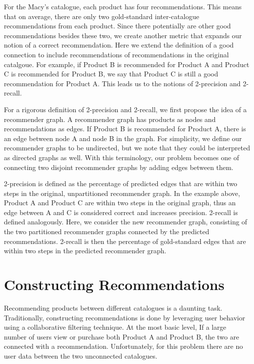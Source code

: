 \documentclass[11pt]{article}
\begin{document}
For the Macy's catalogue, each product has four recommendations. This means that
on average, there are only two gold-standard inter-catalogue recommendations
from each product. Since there potentially are other good
recommendations besides these two, we create another metric that expands our
notion of a correct recommendation. Here we extend the definition of a good
connection to include recommendations of recommendations in the original
catalgoue. For example, if Product B is recommended for Product A and 
Product C is recommended for Product B, we say that Product C is still a good 
recommendation for Product A. This leads us to the notions of 2-precision and 
2-recall.

For a rigorous definition of 2-precision and 2-recall, we first propose the idea
of a recommender graph. A recommender graph has products as nodes and
recommendations as edges. If Product B is recommended for Product A, there is an
edge between node A and node B in the graph. For simplicity, we define our
recommender graphs to be undirected, but we note that they could be interpreted
as directed graphs as well. With this terminology, our problem becomes one of
connecting two disjoint recommender graphs by adding edges between them. 

2-precision is defined as the percentage of predicted edges that are within two
steps in the original, unpartitioned recommender graph. In the example above,
Product A and Product C are within two steps in the original graph, thus an edge
between A and C is considered correct and increases precision. 2-recall is
defined analogously. Here, we consider the new recommender graph, consisting of
the two partitioned recommender graphs connected by the predicted
recommendations. 2-recall is then the percentage of gold-standard edges that 
are within two steps in the predicted recommender graph.

\section*{Constructing Recommendations}
Recommending products between different catalogues is a daunting task.
Traditionally, constructing recommendations is done by leveraging user behavior
using a collaborative filtering technique. At the most basic level, If a large
number of users view or purchase both Product A and Product B, the two are
connected with a recommendation. Unfortunately, for this problem there are no
user data between the two unconnected catalogues.
\end{document}
